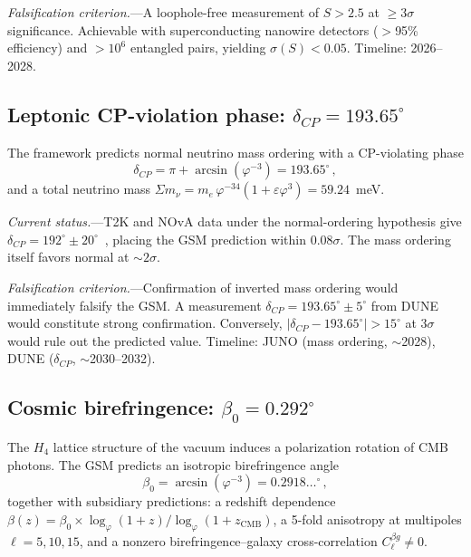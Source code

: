 \documentclass[aps,prl,twocolumn,superscriptaddress,nofootinbib]{revtex4-2}
\newcommand{\vp}{\varphi}
\newcommand{\eps}{\varepsilon}
\begin{document}
\emph{Falsification criterion.}---A loophole-free measurement of $S > 2.5$
at $\ge 3\sigma$ significance.  Achievable with superconducting nanowire
detectors ($>$95\% efficiency) and $>10^6$ entangled pairs, yielding
$\sigma(S) < 0.05$.  Timeline: 2026--2028.

\subsection{Leptonic CP-violation phase: $\delta_{CP} = 193.65^\circ$}
\label{sec:deltacp}

The framework predicts normal neutrino mass ordering with a CP-violating
phase
\begin{equation}
  \delta_{CP} = \pi + \arcsin(\vp^{-3}) = 193.65^\circ\,,
  \label{eq:deltacp}
\end{equation}
and a total neutrino mass $\Sigma m_\nu = m_e\,\vp^{-34}(1 + \eps\vp^3) = 59.24$~meV.

\emph{Current status.}---T2K and NOvA data under the normal-ordering hypothesis
give $\delta_{CP} = 192^\circ \pm 20^\circ$~\cite{pdg2024}, placing the GSM
prediction within $0.08\sigma$.  The mass ordering itself favors normal at
$\sim 2\sigma$.

\emph{Falsification criterion.}---Confirmation of inverted mass ordering would
immediately falsify the GSM.  A measurement $\delta_{CP} = 193.65^\circ \pm 5^\circ$
from DUNE would constitute strong confirmation.
Conversely, $|\delta_{CP} - 193.65^\circ| > 15^\circ$ at $3\sigma$
would rule out the predicted value.  Timeline: JUNO (mass ordering, $\sim$2028),
DUNE ($\delta_{CP}$, $\sim$2030--2032).

\subsection{Cosmic birefringence: $\beta_0 = 0.292^\circ$}
\label{sec:birefringence}

The $H_4$ lattice structure of the vacuum induces a polarization rotation
of CMB photons.  The GSM predicts an isotropic birefringence angle
\begin{equation}
  \beta_0 = \arcsin(\vp^{-3}) = 0.2918\ldots^\circ\,,
  \label{eq:beta}
\end{equation}
together with subsidiary predictions: a redshift dependence
$\beta(z) = \beta_0 \times \log_\vp(1+z)/\log_\vp(1+z_{\mathrm{CMB}})$,
a 5-fold anisotropy at multipoles $\ell = 5, 10, 15$, and a nonzero
birefringence--galaxy cross-correlation $C_\ell^{\beta g} \neq 0$.
\end{document}
